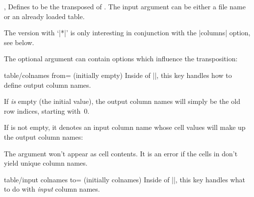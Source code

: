 \documentclass[a4paper]{ltxdoc}
\begin{document}
\begin{commandlist}{%
    \pgfplotstabletranspose{},
    \pgfplotstabletranspose*{}%
}
    Defines  to be the transposed of
    . The input argument can be either a
    file name or an already loaded table.

    The version with `|*|' is only interesting in conjunction with the
    |columns| option, see below.
\begin{codeexample}[]
\end{codeexample}

\begin{codeexample}[]
\pgfplotstabletranspose{}
\loadedtable
\end{codeexample}

    The optional argument  can contain options which influence
    the transposition:
    \begin{pgfplotskey}{table/colnames from= (initially empty)}
        Inside of |\pgfplotstabletranspose|, this key handles how to define
        output column names.

        If  \emph{is} empty (the initial value), the output
        column names will simply be the old row indices, starting with~$0$.

        If  is not empty, it denotes an input column name whose
        cell values will make up the output column names:
\begin{codeexample}[]
\pgfplotstabletranspose[colnames from=c]
\loadedtable
\end{codeexample}
        The argument  won't appear as cell contents. It is an
        error if the cells in  don't yield unique column names.
    \end{pgfplotskey}

    \begin{pgfplotskey}{table/input colnames to= (initially colnames)}
        Inside of |\pgfplotstabletranspose|, this key handles what to do with
        \emph{input} column names.


\end{pgfplotskey}
\end{commandlist}
\end{document}
